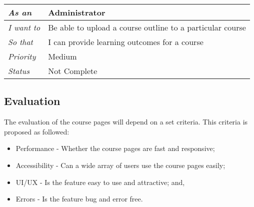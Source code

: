 \begin{table}[h!]
    \begin{tabular}{|l|l|}
        \hline
        \textit{As an} & Administrator \\ \hline
        \textit{I want to} & Be able to upload a course outline to a particular course \\ \hline
        \textit{So that} & I can provide learning outcomes for a course \\ \hline
        \textit{Priority} & {\color[HTML]{FE996B} Medium} \\ \hline
        \textit{Status} & Not Complete \\ \hline
    \end{tabular}
\end{table}

\subsection{Evaluation}
The evaluation of the course pages will depend on a set criteria.
This criteria is proposed as followed:
\begin{itemize}
    \item Performance - Whether the course pages are fast and responsive;
    \item Accessibility - Can a wide array of users use the course pages easily;
    \item UI/UX - Is the feature easy to use and attractive; and,
    \item Errors - Is the feature bug and error free.
\end{itemize}

